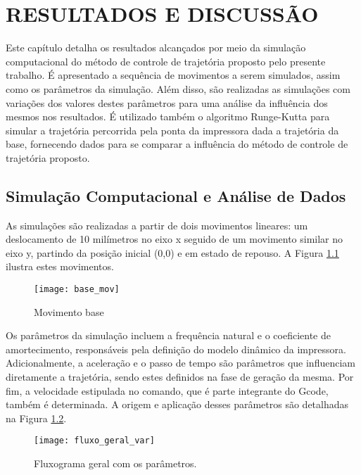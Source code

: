 \chapter{RESULTADOS E DISCUSSÃO}

Este capítulo detalha os resultados alcançados por meio da simulação computacional do método de controle de trajetória proposto pelo presente trabalho. É apresentado a sequência de movimentos a serem simulados, assim como os parâmetros da simulação. Além disso, são realizadas as simulações com variações dos valores destes parâmetros para uma análise da influência dos mesmos nos resultados. É utilizado também o algoritmo Runge-Kutta para simular a trajetória percorrida pela ponta da impressora dada a trajetória da base, fornecendo dados para se comparar a influência do método de controle de trajetória proposto.

\section{Simulação Computacional e Análise de Dados}

As simulações são realizadas a partir de dois movimentos lineares: um deslocamento de 10 milímetros no eixo x seguido de um movimento similar no eixo y, partindo da posição inicial (0,0) e em estado de repouso. A Figura \ref{fig:base_mov} ilustra estes movimentos.

\begin{figure}[H]
    \centering
    \caption{Movimento base}
    \texttt{[image: base\_mov]}

    \label{fig:base_mov}
\end{figure}

Os parâmetros da simulação incluem a frequência natural e o coeficiente de amortecimento, responsáveis pela definição do modelo dinâmico da impressora. Adicionalmente, a aceleração e o passo de tempo são parâmetros que influenciam diretamente a trajetória, sendo estes definidos na fase de geração da mesma. Por fim, a velocidade estipulada no comando, que é parte integrante do Gcode, também é determinada. A origem e aplicação desses parâmetros são detalhadas na Figura \ref{fig:fluxo_geral_var}.

\begin{figure}[H]
    \centering
    \caption{Fluxograma geral com os parâmetros.}
    \texttt{[image: fluxo\_geral\_var]}

    \label{fig:fluxo_geral_var}
\end{figure}

